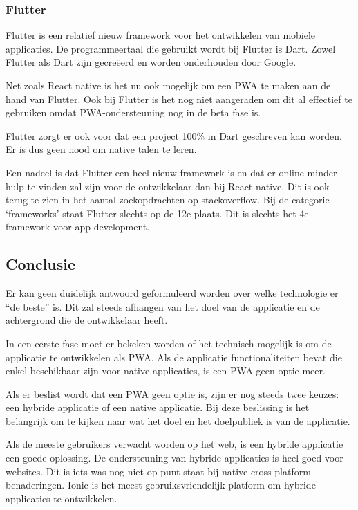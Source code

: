 	\subsubsection{Flutter}
		Flutter \autocite{Flutter2020} is een relatief nieuw framework voor het ontwikkelen van mobiele applicaties. De programmeertaal die gebruikt wordt bij Flutter is Dart. Zowel Flutter als Dart zijn gecreëerd en worden onderhouden door Google. 
		
		Net zoals React native is het nu ook mogelijk om een PWA te maken aan de hand van Flutter. Ook bij Flutter is het nog niet aangeraden om dit al effectief te gebruiken omdat PWA-ondersteuning nog in de beta fase is. 
		
		Flutter zorgt er ook voor dat een project 100\% in Dart geschreven kan worden. Er is dus geen nood om native talen te leren. 
		
		Een nadeel is dat Flutter een heel nieuw framework is en dat er online minder hulp te vinden zal zijn voor de ontwikkelaar dan bij React native. Dit is ook terug te zien in het aantal zoekopdrachten op stackoverflow. Bij de categorie ‘frameworks’ staat Flutter slechts op de 12e plaats. Dit is slechts het 4e framework voor app development.
		\autocite{StackOverflow2020}
		
	\subsection{Conclusie}
	
		Er kan geen duidelijk antwoord geformuleerd worden over welke technologie er “de beste” is. Dit zal steeds afhangen van het doel van de applicatie en de achtergrond die de ontwikkelaar heeft.
		
		
		In een eerste fase moet er  bekeken worden of het technisch mogelijk is om de applicatie te ontwikkelen als PWA. Als de applicatie functionaliteiten bevat die enkel beschikbaar zijn voor native applicaties, is een PWA geen optie meer.
		
		Als er beslist wordt dat een PWA geen optie is, zijn er nog steeds twee keuzes: een hybride applicatie of een native applicatie. Bij deze beslissing is het belangrijk om te kijken naar wat het doel en het doelpubliek is van de applicatie.
		
		 Als de meeste gebruikers verwacht worden op het web, is een hybride applicatie een goede oplossing. De ondersteuning van hybride applicaties is heel goed voor websites. Dit is iets was nog niet op punt staat bij native cross platform benaderingen. Ionic is het meest gebruiksvriendelijk platform om hybride applicaties te ontwikkelen.
		
